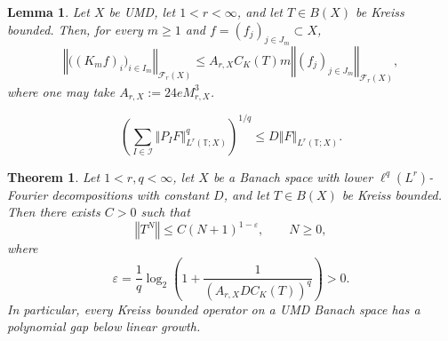 \documentclass[10pt,a4paper]{amsart}
\newtheorem{lemma}{Lemma}
\newtheorem{thm}{Theorem}
\newcommand{\T}{\mathbb{T}}
\newcommand{\norm}[1]{\left\Vert #1\right\Vert}
\begin{document}
	\begin{lemma}\label{lemTriangularFourier}
		Let $X$ be UMD, let $1<r<\infty$, and let $T\in B(X)$ be Kreiss bounded.
		Then, for every $m\ge1$ and $f = (f_j)_{j\in J_m} \subset X$,
		\begin{equation}\label{eqTriangularFourier}
			\norm{\bigl((K_mf)_i\bigr)_{i\in I_m}}_{\mathcal F_r(X)}
			\le
			A_{r,X}C_K(T)m
			\norm{(f_j)_{j\in J_m}}_{\mathcal F_r(X)},
		\end{equation}
		where one may take $A_{r,X}:=24eM_{r,X}^3$.
	\end{lemma}

	\begin{equation}\label{eqLowerFourierDecomposition}
		\left(
		\sum_{I\in\mathcal I}
		\norm{P_IF}_{L^r(\T;X)}^q
		\right)^{1/q}
		\le
		D\norm{F}_{L^r(\T;X)}.
	\end{equation}

	\begin{thm}\label{thmUMDPolynomialGap}
		Let $1<r,q<\infty$, let $X$ be a Banach space with lower
		$\ell^q(L^r)$-Fourier decompositions with constant $D$, and let
		$T\in B(X)$ be Kreiss bounded. Then there exists $C>0$ such that
		\[
		\norm{T^N}
		\le
		C(N+1)^{1-\varepsilon},
		\qquad N\ge0,
		\]
		where
		\[
		\varepsilon
		=
		\frac1q
		\log_2\left(
		1+\frac{1}{(A_{r,X}DC_K(T))^q}
		\right)>0.
		\]
		In particular, every Kreiss bounded operator on a UMD Banach space has a
		polynomial gap below linear growth.
	\end{thm}
\end{document}
